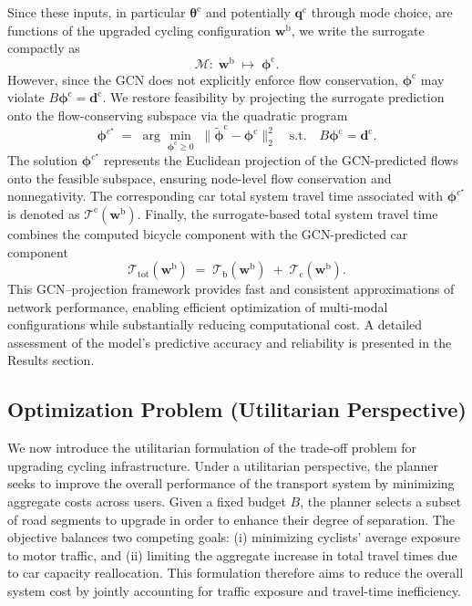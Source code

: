 \documentclass[lettersize,journal]{IEEEtran}
\begin{document}
Since these inputs, in particular $\boldsymbol{\theta}^\mathrm{c}$ and potentially $\boldsymbol{q}^\mathrm{c}$ through mode choice, are functions of the upgraded cycling configuration $\boldsymbol{w}^\mathrm{b}$, we write the surrogate compactly as
\begin{equation}
    \mathcal{M}:\; \boldsymbol{w}^\mathrm{b} \;\longmapsto\;
    \boldsymbol{\phi}^\mathrm{c}.
\end{equation}
However, since the GCN does not explicitly enforce flow conservation, $\boldsymbol{\phi}^\mathrm{c}$ may violate $B \boldsymbol{\phi}^\mathrm{c} = \boldsymbol{d}^\mathrm{c}$. We restore feasibility by projecting the surrogate prediction onto the flow-conserving subspace via the quadratic program
\begin{equation}
    \boldsymbol{\phi}^{c^{\star}}
    \;=\;
    \arg\min_{\boldsymbol{\phi}^\mathrm{c} \ge 0}\;
      \big\|\tilde{\boldsymbol{\phi}}^\mathrm{c} - \boldsymbol{\phi}^\mathrm{c}\big\|_2^2
      \quad \text{s.t.}\quad
      B \boldsymbol{\phi}^\mathrm{c} = \boldsymbol{d}^\mathrm{c}.
\end{equation}
The solution $\boldsymbol{\phi}^{c^{\star}}$ represents the Euclidean projection of the GCN-predicted flows onto the feasible subspace, ensuring node-level flow conservation and nonnegativity. 
The corresponding car total system travel time associated with $\boldsymbol{\phi}^{c^{\star}}$ is  denoted as $\mathcal{T}^\mathrm{c}(\boldsymbol{w}^\mathrm{b})$. 
Finally, the surrogate-based total system travel time combines the computed bicycle component with the GCN-predicted car component
\begin{equation}
\label{total_system_travel}
    \mathcal{T}_{\mathrm{tot}}(\boldsymbol{w}^\mathrm{b})
    \;=\;
    \mathcal{T}_\mathrm{b}(\boldsymbol{w}^\mathrm{b})
    \;+\;
    \mathcal{T}_\mathrm{c}(\boldsymbol{w}^\mathrm{b}).
\end{equation}
This GCN--projection framework provides fast and consistent approximations of network performance, enabling efficient optimization of multi-modal configurations while substantially reducing computational cost. A detailed assessment of the model’s predictive accuracy and reliability is presented in the Results section.


\subsection{Optimization Problem (Utilitarian Perspective)}

We now introduce the utilitarian formulation of the trade-off problem for upgrading cycling infrastructure. 
Under a utilitarian perspective, the planner seeks to improve the overall performance of the transport system by minimizing aggregate costs across users. 
Given a fixed budget $B$, the planner selects a subset of road segments to upgrade in order to enhance their degree of separation. 
The objective balances two competing goals: (i) minimizing cyclists’ average exposure to motor traffic, and (ii) limiting the aggregate increase in total travel times due to car capacity reallocation. 
This formulation therefore aims to reduce the overall system cost by jointly accounting for traffic exposure and travel-time inefficiency.
\end{document}
